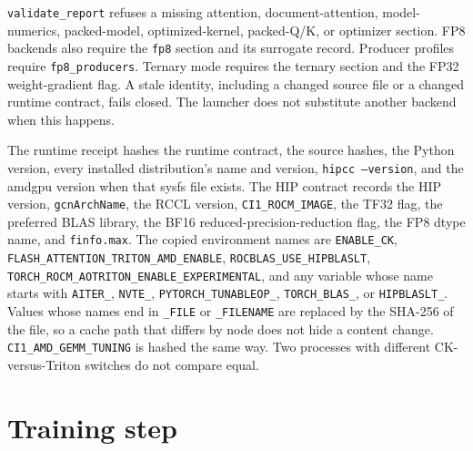\documentclass[11pt]{article}
\DeclareRobustCommand{\code}[1]{\texttt{#1}}
\begin{document}
\code{validate\_report} refuses a missing attention, document-attention,
model-numerics, packed-model, optimized-kernel, packed-Q/K, or optimizer
section. FP8 backends also require the \code{fp8} section and its surrogate
record. Producer profiles require \code{fp8\_producers}. Ternary mode
requires the ternary section and the FP32 weight-gradient flag. A stale
identity, including a changed source file or a changed runtime contract,
fails closed. The launcher does not substitute another backend when this
happens.

The runtime receipt hashes the runtime contract, the source hashes, the
Python version, every installed distribution's name and version,
\code{hipcc --version}, and the amdgpu version when that sysfs file exists.
The HIP contract records the HIP version, \code{gcnArchName}, the RCCL
version, \code{CI1\_ROCM\_IMAGE}, the TF32 flag, the preferred BLAS library,
the BF16 reduced-precision-reduction flag, the FP8 dtype name, and
\code{finfo.max}. The copied environment names are
\code{ENABLE\_CK},
\code{FLASH\_ATTENTION\_TRITON\_AMD\_ENABLE},
\code{ROCBLAS\_USE\_HIPBLASLT},
\code{TORCH\_ROCM\_AOTRITON\_ENABLE\_EXPERIMENTAL},
and any variable whose name starts with
\code{AITER\_}, \code{NVTE\_}, \code{PYTORCH\_TUNABLEOP\_},
\code{TORCH\_BLAS\_}, or \code{HIPBLASLT\_}.
Values whose names end in \code{\_FILE} or \code{\_FILENAME} are replaced by
the SHA-256 of the file, so a cache path that differs by node does not hide
a content change. \code{CI1\_AMD\_GEMM\_TUNING} is hashed the same way. Two
processes with different CK-versus-Triton switches do not compare equal.

\section{Training step}
\end{document}
